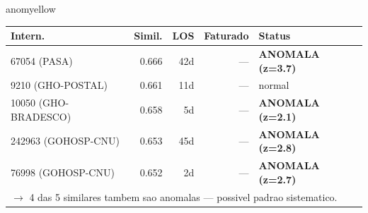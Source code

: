 \documentclass[a4paper,10pt]{article}
\begin{document}
\begin{anomalycard}[Internacao 3730 | GHO-AMIL | MODERADO (z=2.54)]{anomyellow}
\begin{tabular}{l r r r l}\toprule\textbf{Intern.} & \textbf{Simil.} & \textbf{LOS} & \textbf{Faturado} & \textbf{Status} \\\midrule
67054 (PASA) & 0.666 & 42d & --- & \textcolor{anomred}{\textbf{ANOMALA (z=3.7)}} \\
9210 (GHO-POSTAL) & 0.661 & 11d & --- & \textcolor{jcubeblue}{normal} \\
10050 (GHO-BRADESCO) & 0.658 & 5d & --- & \textcolor{anomred}{\textbf{ANOMALA (z=2.1)}} \\
242963 (GOHOSP-CNU) & 0.653 & 45d & --- & \textcolor{anomred}{\textbf{ANOMALA (z=2.8)}} \\
76998 (GOHOSP-CNU) & 0.652 & 2d & --- & \textcolor{anomred}{\textbf{ANOMALA (z=2.7)}} \\
\multicolumn{5}{l}{\textcolor{anomred}{\small $\rightarrow$ 4 das 5 similares tambem sao anomalas --- possivel padrao sistematico.}} \\
\bottomrule\end{tabular}


\end{anomalycard}

\newpage
\end{document}
